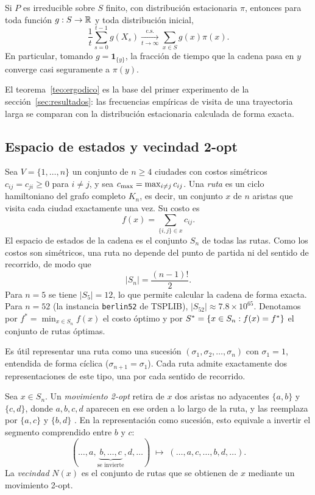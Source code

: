 \begin{teorema}
\label{teo:ergodico}
Si \(P\) es irreducible sobre \(S\) finito, con distribución
estacionaria \(\pi\), entonces para toda función \(g:S\to\mathbb{R}\) y toda
distribución inicial,
\[
\frac1t\sum_{s=0}^{t-1}g(X_s)\xrightarrow[t\to\infty]{\text{c.s.}}
\sum_{x\in S}g(x)\pi(x).
\]
En particular, tomando \(g=\mathbf 1_{\{y\}}\), la fracción de tiempo
que la cadena pasa en \(y\) converge casi seguramente a \(\pi(y)\).
\end{teorema}

El teorema~\ref{teo:ergodico} es la base del primer experimento de la
sección~\ref{sec:resultados}: las frecuencias empíricas de visita de
una trayectoria larga se comparan con la distribución estacionaria
calculada de forma exacta.

\subsection{Espacio de estados y vecindad 2-opt}
\label{subsec:estados}

Sea \(V=\{1,\ldots,n\}\) un conjunto de \(n\ge 4\) ciudades con costos
simétricos \(c_{ij}=c_{ji}\ge 0\) para \(i\ne j\), y sea
\(c_{\max}=\max_{i\ne j}c_{ij}\). Una \emph{ruta} es un ciclo
hamiltoniano del grafo completo \(K_n\), es decir, un conjunto
\(x\) de \(n\) aristas que visita cada ciudad exactamente una vez. Su
costo es
\[
f(x)=\sum_{\{i,j\}\in x}c_{ij}.
\]
El espacio de estados de la cadena es el conjunto \(S_n\) de todas las
rutas. Como los costos son simétricos, una ruta no depende del punto de
partida ni del sentido de recorrido, de modo que
\begin{equation}
\label{eq:num_rutas}
|S_n|=\frac{(n-1)!}{2}.
\end{equation}
Para \(n=5\) se tiene \(|S_5|=12\), lo que permite calcular la cadena de
forma exacta. Para \(n=52\) (la instancia \texttt{berlin52} de TSPLIB),
\(|S_{52}|\approx 7.8\times10^{65}\). Denotamos por
\(f^\ast=\min_{x\in S_n}f(x)\) el costo óptimo y por
\(S^{\ast}=\{x\in S_n:f(x)=f^\ast\}\) el conjunto de rutas óptimas.

Es útil representar una ruta como una sucesión
\((\sigma_1,\sigma_2,\ldots,\sigma_n)\) con \(\sigma_1=1\), entendida de
forma cíclica (\(\sigma_{n+1}=\sigma_1\)). Cada ruta admite exactamente
dos representaciones de este tipo, una por cada sentido de recorrido.

\begin{definicion}
\label{def:2opt}
Sea \(x\in S_n\). Un \emph{movimiento 2-opt} retira de \(x\) dos aristas
no adyacentes \(\{a,b\}\) y \(\{c,d\}\), donde \(a,b,c,d\) aparecen en
ese orden a lo largo de la ruta, y las reemplaza por \(\{a,c\}\) y
\(\{b,d\}\) \citep{croes1958}. En la representación como sucesión, esto
equivale a invertir el segmento comprendido entre \(b\) y \(c\):
\[
(\ldots,a,\underbrace{b,\ldots,c}_{\text{se invierte}},d,\ldots)
\;\longmapsto\;
(\ldots,a,c,\ldots,b,d,\ldots).
\]
La \emph{vecindad} \(N(x)\) es el conjunto de rutas que se obtienen de
\(x\) mediante un movimiento 2-opt.
\end{definicion}

